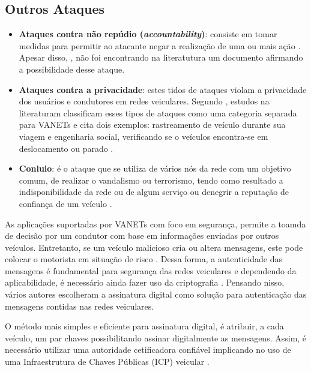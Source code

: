 \documentclass[
	12pt,				%
	oneside,			%
	a4paper,			%
	english,			%
	brazil				%
	]{abntex2ppgsi}
\begin{document}
\subsection{Outros Ataques}

\begin{itemize}
	
	\item {\textbf{Ataques contra não repúdio (\textit{accountability})}: consiste em tomar medidas para permitir ao atacante negar a realização de uma ou mais ação \cite{wanghamsegurancca}. Apesar disso, , não foi encontrando na literatutura um documento afirmando a possibilidade desse ataque.}
	
	\item {\textbf{Ataques contra a privacidade}: estes tidos de ataques violam a privacidade dos usuários e condutores em redes veiculares. Segundo }, estudos na literaturam classificam esses tipos de ataques como uma categoria separada para VANETs e cita dois exemplos: rastreamento de veículo durante sua viagem e engenharia social, verificando se o veículos encontra-se em deslocamento ou parado \cite{mejri2014survey}.
	
	\item {\textbf{Conluio}: é o ataque que se utiliza de vários nós da rede com um objetivo comum, de realizar o vandalismo ou terrorismo, tendo como resultado a indisponibilidade da rede  ou de algum serviço ou denegrir a reputação de confiança de um veículo \cite{zhang2011survey}.}
	
\end{itemize}

As aplicações suportadas por VANETs com foco em segurança, permite a toamda de decisão por um condutor com base em informações enviadas por outros veículos. Entretanto, se um veículo malicioso cria ou altera mensagens, este pode colocar o motorista em situação de risco \cite{wasef2010complementing}. Dessa forma, a autenticidade das mensagens é fundamental para segurança das redes veiculares e dependendo da aplicabilidade, é necessário ainda fazer uso da criptografia \cite{wanghamsegurancca}. Pensando nisso, vários autores \cite{raya2006securing} \cite{mejri2014survey} escolheram a assinatura digital como solução para autenticação das mensagens contidas nas redes veiculares. 

O método mais simples e eficiente para assinatura digital, é atribuir, a cada veículo, um par chaves possibilitando assinar digitalmente as mensagens. Assim, é necessário utilizar uma autoridade cetificadora confiável implicando no uso de uma Infraestrutura  de Chaves Públicas (ICP) veicular \cite{wasef2010complementing}.
\end{document}
